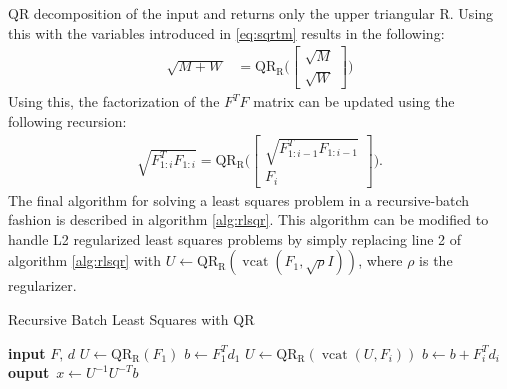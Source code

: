 \documentclass{article}
\begin{document}
QR decomposition of the input and returns only the upper triangular R. Using this with the
variables introduced in \eqref{eq:sqrtm} results in the following:
\begin{align}
    \sqrt{M + W} &= \operatorname{QR_R}\bigg( \begin{bmatrix} \sqrt{M} \\ \sqrt{W} \end{bmatrix} \bigg)
\end{align}
Using this, the factorization of the $F^TF$ matrix can be updated using the following
recursion:
\begin{align}
    \sqrt{F_{1:i}^TF_{1:i}} = \operatorname{QR_R}\bigg( \begin{bmatrix} \sqrt{F_{1:i-1}^TF_{1:i-1}} \\ F_i \end{bmatrix} \bigg).
\end{align}
The final algorithm for solving a least squares problem in a recursive-batch fashion is
described in algorithm \ref{alg:rlsqr}. This algorithm can be modified to handle L2
regularized least squares problems by simply replacing line 2 of algorithm \ref{alg:rlsqr}
with $U\leftarrow \operatorname{QR_R}(\operatorname{vcat}(F_1,\sqrt{\rho}I))$, where $\rho$
is the regularizer. 
 \begin{algorithm} 
	\begin{algorithmic}[1]
		\caption{Recursive Batch Least Squares with QR}\label{alg:rlsqr}
		\State \textbf{input} $F,\,d$  
		\State $U \leftarrow \operatorname{QR_R}(F_1)$ 
		\State $b \leftarrow F_1^Td_1$ 
        \State $U \leftarrow \operatorname{QR_R}(\operatorname{vcat}(U,F_i)) $ 
		\State $b \leftarrow b + F_i^Td_i$ 
		\EndFor
		\State \textbf{ouput} \,$x \leftarrow U^{-1}U^{-T}b$ 
	\end{algorithmic}
\end{algorithm}
\end{document}
